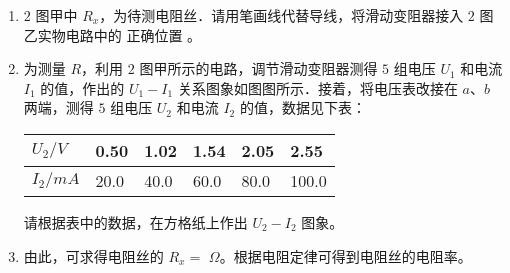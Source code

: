 \begin{enumerate}
\begin{enumerate}
\item 
$ 2 $ 图甲中 $ R_{x} $，为待测电阻丝．请用笔画线代替导线，将滑动变阻器接入 $ 2 $ 图乙实物电路中的
正确位置 \underlinegap 。
\begin{figure}[h!]
\centering
\begin{subfigure}{0.4\linewidth}
\centering
 
\caption{}\label{}
\end{subfigure}
\begin{subfigure}{0.4\linewidth}
\centering
 
\caption{}\label{}
\end{subfigure}
\end{figure}



\item 
为测量 $ R $，利用 $ 2 $ 图甲所示的电路，调节滑动变阻器测得 $ 5 $ 组电压 $ U_{1} $ 和电流 $ I_{1} $ 的值，作出的
$ U_{1} - I_{1} $ 关系图象如图图所示．接着，将电压表改接在 $ a $、$ b $ 两端，测得 $ 5 $ 组电压 $ U_{2} $ 和电流 $ I_{2} $ 的值，数据见下表：
\begin{table}[h!]
\centering 
\begin{tabular}{|l|l|l|l|l|l|}
\hline$U_{2} / V$ & 0.50 & 1.02 & 1.54 & 2.05 & 2.55 \\
\hline$I_{2} / mA$ & 20.0 & 40.0 & 60.0 & 80.0 & 100.0 \\
\hline
\end{tabular}
\end{table} 



请根据表中的数据，在方格纸上作出 $ U_{2} - I_{2} $ 图象。
\begin{figure}[h!]
\centering

\end{figure}

\item 
由此，可求得电阻丝的 $ R_{x} =$ \underlinegap $ \Omega $。根据电阻定律可得到电阻丝的电阻率。



\end{enumerate}





\end{enumerate}
